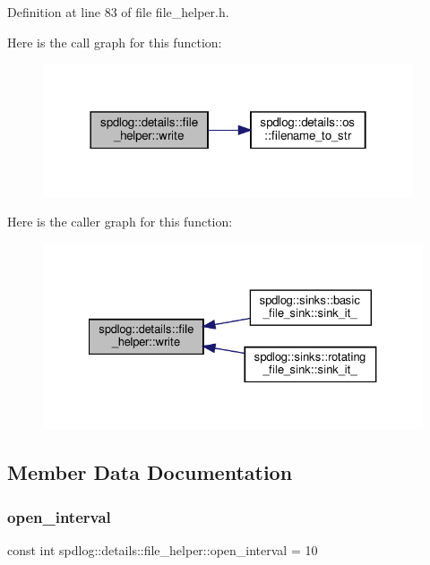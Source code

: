 Definition at line 83 of file file\+\_\+helper.\+h.

Here is the call graph for this function\+:
\nopagebreak
\begin{figure}[H]
\begin{center}
\leavevmode
\includegraphics[width=310pt]{classspdlog_1_1details_1_1file__helper_a51eb58a2d46f1896f3ab7b9d323d97ae_cgraph}
\end{center}
\end{figure}
Here is the caller graph for this function\+:
\nopagebreak
\begin{figure}[H]
\begin{center}
\leavevmode
\includegraphics[width=327pt]{classspdlog_1_1details_1_1file__helper_a51eb58a2d46f1896f3ab7b9d323d97ae_icgraph}
\end{center}
\end{figure}


\subsection{Member Data Documentation}
\mbox{\label{classspdlog_1_1details_1_1file__helper_aea72ea8d655bb11f19dbe48477e6c8b3}} 
\subsubsection{\texorpdfstring{open\+\_\+interval}{open\_interval}}
{\footnotesize\ttfamily const int spdlog\+::details\+::file\+\_\+helper\+::open\+\_\+interval = 10}



